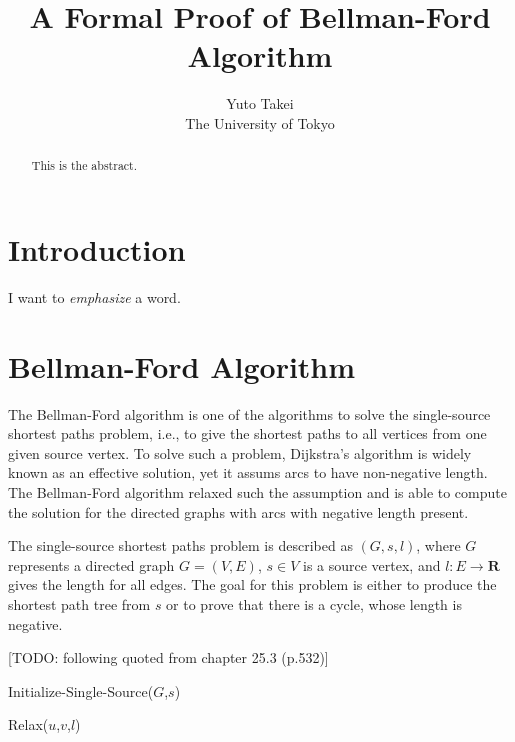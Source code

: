 \documentclass[a4paper,12pt]{article}
\title{A Formal Proof of Bellman-Ford Algorithm}
\author{Yuto Takei \\ The University of Tokyo }
\begin{document}
\maketitle

\begin{abstract}
  This is the abstract.
\end{abstract}

\section{Introduction}

I want to \emph{emphasize} a word.

\section{Bellman-Ford Algorithm}

The Bellman-Ford algorithm is one of the algorithms to solve the single-source shortest paths problem, i.e., to give the shortest paths to all vertices from one given source vertex. To solve such a problem, Dijkstra's algorithm is widely known as an effective solution, yet it assums arcs to have non-negative length. The Bellman-Ford algorithm relaxed such the assumption and is able to compute the solution for the directed graphs with arcs with negative length present.

The single-source shortest paths problem is described as \( (G,s,l) \), where \( G \) represents a directed graph \( G=(V,E) \), \( s \in V \) is a source vertex, and \( l : E \rightarrow \mathbf{R} \) gives the length for all edges. The goal for this problem is either to produce the shortest path tree from \( s \) or to prove that there is a cycle, whose length is negative.


[TODO: following quoted from chapter 25.3 (p.532)]

\begin{algorithm}
\caption{Initialize-Single-Source($G$,$s$)}
\begin{algorithmic}
\ENDFOR
{}
\end{algorithmic}
\end{algorithm}

\begin{algorithm}
\caption{Relax($u$,$v$,$l$)}
\begin{algorithmic}
\ENDIF
\end{algorithmic}
\end{algorithm}
\end{document}
